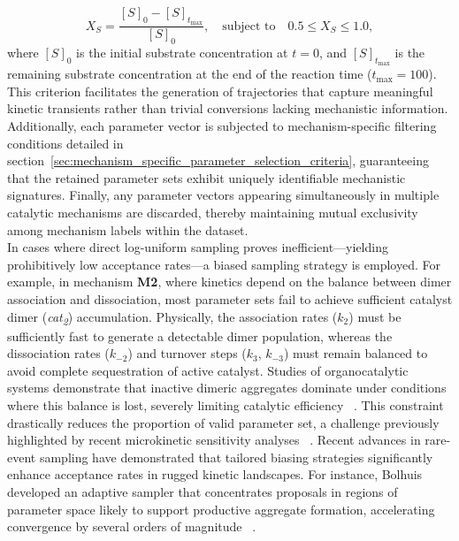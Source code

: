 \documentclass{dissertation}
\begin{document}
\begin{equation}
X_S = \frac{[S]_0 - [S]_{t_{\text{max}}}}{[S]_0}, \quad \text{subject to} \quad 0.5 \leq X_S \leq 1.0,
\end{equation}
where $[S]_0$ is the initial substrate concentration at $t = 0$, and $[S]_{t_{\text{max}}}$ is the remaining substrate concentration at the end of the reaction time ($t_{\text{max}} = 100$). This criterion facilitates the generation of trajectories that capture meaningful kinetic transients rather than trivial conversions lacking mechanistic information. Additionally, each parameter vector is subjected to mechanism-specific filtering conditions detailed in section~\ref{sec:mechanism_specific_parameter_selection_criteria}, guaranteeing that the retained parameter sets exhibit uniquely identifiable mechanistic signatures. Finally, any parameter vectors appearing simultaneously in multiple catalytic mechanisms are discarded, thereby maintaining mutual exclusivity among mechanism labels within the dataset.\\

In cases where direct log-uniform sampling proves inefficient—yielding prohibitively low acceptance rates—a biased sampling strategy is employed. For example, in mechanism \textbf{M2}, where kinetics depend on the balance between dimer association and dissociation, most parameter sets fail to achieve sufficient catalyst dimer (\emph{cat\textsubscript{2}}) accumulation. Physically, the association rates ($k_2$) must be sufficiently fast to generate a detectable dimer population, whereas the dissociation rates ($k_{-2}$) and turnover steps ($k_3$, $k_{-3}$) must remain balanced to avoid complete sequestration of active catalyst. Studies of organocatalytic systems demonstrate that inactive dimeric aggregates dominate under conditions where this balance is lost, severely limiting catalytic efficiency ~\cite{Ali2022, Ford2016}. This constraint drastically reduces the proportion of valid parameter set, a challenge previously highlighted by recent microkinetic sensitivity analyses ~\cite{Motagamwala2021}. Recent advances in rare-event sampling have demonstrated that tailored biasing strategies significantly enhance acceptance rates in rugged kinetic landscapes. For instance, Bolhuis developed an adaptive sampler that concentrates proposals in regions of parameter space likely to support productive aggregate formation, accelerating convergence by several orders of magnitude ~\cite{Bolhuis2025}.\\
\end{document}
